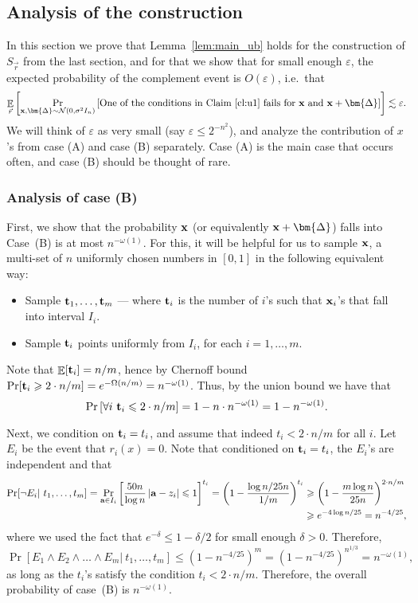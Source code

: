 \documentclass[10pt,a4paper]{article}
\newcommand\E{\mathop{\mathbb{E}}}
\newcommand\card[1]{\left| {#1} \right|}
\newcommand\Prob[2]{{\Pr_{#1}\left[ {#2} \right]}}
\newcommand\Expect[2]{{\mathop{\mathbb{E}}_{#1}\left[ {#2} \right]}}
\newcommand\eps{\varepsilon}
\renewcommand\geq{\geqslant}
\renewcommand\ge{\geqslant}
\renewcommand\leq{\leqslant}
\newcommand{\De}{\Delta}
\def\ll{\lesssim}
\begin{document}
\subsection{Analysis of the construction}\label{sec:analysis_rare}
In this section we prove that Lemma~\ref{lem:main_ub} holds for the construction of $S_{\vec{r}}$ from the last section, and for
that we show that for small enough $\eps$, the expected probability of the complement event is $O(\eps)$, i.e.\ that
\begin{equation}\label{eq:main_ub}
\Expect{\vec{r}}{\Prob{{\bf x}, \bm{\De}\sim\mathcal{N}(0, \sigma^2 I_n)}
{\text{One of the conditions in Claim~\ref{cl:u1} fails for ${\bf x}$ and ${\bf x}+\bm{\De}$}}}
\ll \eps.
\end{equation}
We will think of $\eps$ as very small (say $\eps \leq 2^{-n^2}$), and analyze the contribution of $x$'s from case (A) and case (B) separately.
Case (A) is the main case that occurs often, and case (B) should be thought of rare.


\subsubsection{Analysis of case (B)}
First, we show that the probability ${\bf x}$ (or equivalently ${\bf x}+\bm{\De}$) falls into Case~(B) is at most $n^{-\omega(1)}$.
For this, it will be helpful for us to sample ${\bf x}$, a multi-set of $n$ uniformly chosen numbers in $[0,1]$ in the following equivalent way:
\begin{itemize}
	\item
	Sample ${\bf t}_1,\ldots,{\bf t}_m$ --- where ${\bf t}_i$ is the number of $i$'s such that ${\bf x}_i$'s that fall into interval $I_i$.
	\item Sample ${\bf t}_i$ points uniformly from $I_i$, for each $i=1,\ldots,m$.
\end{itemize}
Note that $\E[{\bf t}_i]=n/m$, hence by Chernoff bound $\Pr[{\bf t}_i\ge 2 \cdot n/m] =e^{-\Omega(n/m)}=n^{-\omega(1)}$. Thus, by
the union bound we have that
\[
\Prob{}{\forall i ~{\bf t}_i\leq 2\cdot n/m} = 1 - n\cdot n^{-\omega(1)} = 1-n^{-\omega(1)}.
\]
Next, we condition on ${\bf t}_i = t_i$, and assume that indeed $t_i<2\cdot n/m$ for all $i$. Let $E_i$ be the event that $r_i(x)=0$.
Note that conditioned on ${\bf t}_i = t_i$, the $E_i$'s are independent and that
\begin{align}
\Pr[\neg E_i|~t_1,\ldots,t_m]
=\Prob{{\bf a}\in I_i}{\frac{50 n}{\log n}\card{{\bf a}-z_i}\leq 1}^{t_i}
=\left( 1-\frac{\log n/25n}{1/m} \right)^{t_i}
&\geq
\left( 1-\frac{m \log n}{25 n} \right)^{2 \cdot n/m}\notag\\\label{eq:notEi}
&\geq e^{-4\log n/25}
= n^{-4/25},
\end{align}
where we used the fact that $e^{-\delta}\leq 1-\delta/2$ for small enough $\delta>0$.
Therefore,
$$
\Pr[E_1\wedge E_2 \wedge \ldots \wedge E_m|~t_1,\ldots,t_m] 
\leq (1-n^{-4/25})^m
=(1-n^{-4/25})^{n^{1/3}} = n^{-\omega(1)},
$$
as long as the $t_i$'s satisfy the condition $t_i<2\cdot n/m$. Therefore, the overall probability of case~(B) is $n^{-\omega(1)}$.
\end{document}
